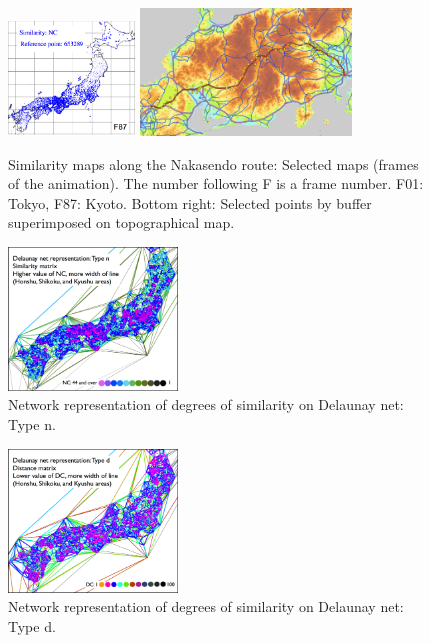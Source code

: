 \documentclass[output=paper]{LSP/langsci}
\begin{document}
\begin{figure}
\\
\includegraphics[width=0.3\textwidth]{illustrations/kuma_fig21-F87}
\includegraphics[width=0.5\textwidth]{illustrations/kuma_fig21-Points}
\caption{Similarity maps along the Nakasendo route: Selected maps (frames of the animation). The number following F is a frame number. F01: Tokyo, F87: Kyoto. Bottom right: Selected points by buffer superimposed on topographical map.}          
\label{fig:21}
\end{figure}

\begin{figure}
\includegraphics[width=0.4\textwidth]{illustrations/kuma_fig22}
\caption{Network representation of degrees of similarity on Delaunay net: Type n.}
\label{fig:22}
\end{figure}

\begin{figure}
\includegraphics[width=0.4\textwidth]{illustrations/kuma_fig23}
\caption{Network representation of degrees of similarity on Delaunay net: Type d.}
\label{fig:23}
\end{figure}          
\end{document}
